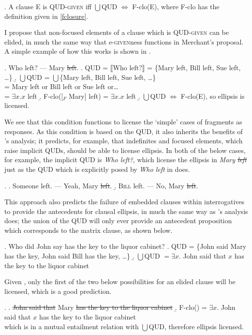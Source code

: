 \documentclass[doublespace]{umthesis}
\newcommand{\ext}[1]{\ensuremath{\llbracket \textrm{{#1}} \rrbracket}}
\begin{document}
\ex. 	A clause E is QUD-\textsc{given} iff $\bigcup$QUD $\Leftrightarrow$ F-clo(E), where F-clo has the definition given in \ref{fclosure}.

I propose that non-focused elements of a clause which is QUD-\textsc{given} can be elided, in much the same way that e-\textsc{given}ness functions in Merchant's proposal. A simple example of how this works is shown in \Next.

\ex. 	Who left? --- Mary \sout{left}.
	\a. QUD = \ext{Who left?} = \{Mary left, Bill left, Sue left, \ldots\}
	\b. $\bigcup$QUD = $\bigcup$\{Mary left, Bill left, Sue left, \ldots\}\\
	= Mary left or Bill left or Sue left or\ldots \\
	= $\exists x. x$ left
	\b. F-clo([$_F$ Mary] left) = $\exists x. x$ left
	\b. $\bigcup$QUD $\Leftrightarrow$ F-clo(E), so ellipsis is licensed.
	
We see that this condition functions to license the `simple' cases of fragments as responses. As this condition is based on the QUD, it also inherits the benefits of \cite{Re07}'s analysis; it predicts, for example, that indefinites and focused elements, which raise implicit QUDs, should be able to license ellipsis. In both of the below cases, for example, the implicit QUD is {\it Who left?}, which license the ellipsis in {\it Mary \sout{left}} just as the QUD which is explicitly posed by {\it Who left} in \Last does.

\ex. 	\a. Someone left. --- Yeah, Mary \sout{left}.
	\b. \textsc{Bill} left. --- No, Mary \sout{left}.
	
This approach also predicts the failure of embedded clauses within interrogatives to provide the antecedents for clausal ellipsis, in much the same way as \cite{Re07}'s analysis does; the union of the QUD will only ever provide an antecedent proposition which corresponds to the matrix clause, as shown below.

\ex. 	Who did John say has the key to the liquor cabinet?
	\a. QUD = \{John said Mary has the key, John said Bill has the key, \ldots\}
	\b. $\bigcup$QUD $= \exists x. $ John said that $x$ has the key to the liquor cabinet
	
Given \Last[b], only the first of the two below possibilities for an elided clause will be licensed, which is a good prediction.

\ex. 	\a. \sout{John said that} Mary \sout{has the key to the liquor cabinet}
	\b. F-clo(\Last[a]) = $\exists x.$ John said that $x$ has the key to the liquor cabinet\\
	which is in a mutual entailment relation with $\bigcup$QUD, therefore ellipsis licensed.
	
\end{document}
